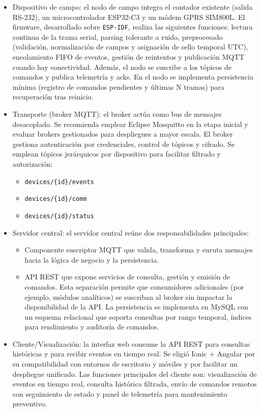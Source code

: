 \begin{itemize}

  \item {Dispositivo de campo:} el nodo de campo integra el contador existente (salida RS-232), un microcontrolador ESP32-C3 y un módem GPRS SIM800L. El firmware, desarrollado sobre \texttt{ESP-IDF}, realiza las siguientes funciones: lectura continua de la trama serial, parsing tolerante a ruido, preprocesado (validación, normalización de campos y asignación de sello temporal UTC), encolamiento FIFO de eventos, gestión de reintentos y publicación MQTT cuando hay conectividad. Además, el nodo se suscribe a los tópicos de comandos y publica telemetría y acks. En el nodo se implementa persistencia mínima (registro de comandos pendientes y últimas N tramas) para recuperación tras reinicio.

  \item {Transporte (broker MQTT):} el broker actúa como bus de mensajes desacoplado. Se recomienda emplear Eclipse Mosquitto en la etapa inicial y evaluar brokers gestionados para despliegues a mayor escala. El broker gestiona autenticación por credenciales, control de tópicos y cifrado. Se emplean tópicos jerárquicos por dispositivo para facilitar filtrado y autorización: 

\begin{itemize}
  \item \texttt{devices/\{id\}/events}
  \item \texttt{devices/\{id\}/comm} 
  \item \texttt{devices/\{id\}/status}
\end{itemize}


\item {Servidor central:} el servidor central reúne dos responsabilidades principales: 

\begin{itemize}  

\item  Componente suscriptor MQTT que valida, transforma y enruta mensajes hacia la lógica de negocio y la persistencia.

\item API REST que expone servicios de consulta, gestión y emisión de comandos. Esta separación permite que consumidores adicionales (por ejemplo, módulos analíticos) se suscriban al broker sin impactar la disponibilidad de la API. La persistencia se implementa en MySQL con un esquema relacional que soporta consultas por rango temporal, índices para rendimiento y auditoría de comandos.
 \end{itemize}

  \item {Cliente/Visualización:} la interfaz web consume la API REST para consultas históricas y para recibir eventos en tiempo real. Se eligió Ionic + Angular por su compatibilidad con entornos de escritorio y móviles y por facilitar un despliegue unificado. Las funciones principales del cliente son: visualización de eventos en tiempo real, consulta histórica filtrada, envío de comandos remotos con seguimiento de estado y panel de telemetría para mantenimiento preventivo.
\end{itemize}

